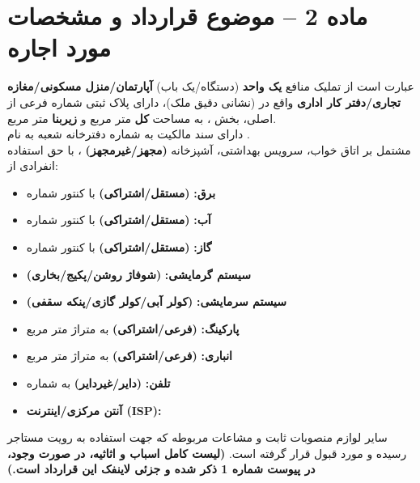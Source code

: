 \documentclass[14pt]{article}
\begin{document}
	\section*{ماده 2 – موضوع قرارداد و مشخصات مورد اجاره}
	عبارت است از تملیک منافع
	\textbf{یک واحد} (دستگاه/یک باب)
	\textbf{آپارتمان/منزل مسکونی/مغازه تجاری/دفتر کار اداری}
	 واقع در
	\underline{\hspace{5cm}}
	 (نشانی دقیق ملک)، دارای پلاک ثبتی شماره
	\underline{\hspace{2cm}}
	 فرعی از
	\underline{\hspace{2cm}}
	 اصلی، بخش
	\underline{\hspace{2cm}}
	، به مساحت
	\textbf{کل}
	\underline{\hspace{2cm}}
	 متر مربع و
	\textbf{زیربنا}
	\underline{\hspace{2cm}}
	 متر مربع.
	\\
	دارای سند مالکیت به شماره
	\underline{\hspace{3cm}}
	 دفترخانه
	\underline{\hspace{2cm}}
	 شعبه
	\underline{\hspace{1cm}}
	 به نام
	\underline{\hspace{2cm}}
	.
	\\
	مشتمل بر
	\underline{\hspace{1cm}}
	 اتاق خواب،
	\underline{\hspace{1cm}}
	 سرویس بهداشتی، آشپزخانه
	\textbf{(مجهز/غیرمجهز)}
	، با حق استفاده انفرادی از:
	\begin{itemize}
		\item
		\textbf{برق:}
		\textbf{(مستقل/اشتراکی)} با کنتور شماره
		\underline{\hspace{3cm}}
		\item
		\textbf{آب:}
		\textbf{(مستقل/اشتراکی)} با کنتور شماره
		\underline{\hspace{3cm}}
		\item
		\textbf{گاز:}
		\textbf{(مستقل/اشتراکی)} با کنتور شماره
		\underline{\hspace{3cm}}
		\item
		\textbf{سیستم گرمایشی:}
		\textbf{(شوفاژ روشن/پکیج/بخاری)}
		\item
		\textbf{سیستم سرمایشی:}
		\textbf{(کولر آبی/کولر گازی/پنکه سقفی)}
		\item
		\textbf{پارکینگ:}
		\textbf{(فرعی/اشتراکی)} به متراژ
		\underline{\hspace{2cm}} متر مربع
		\item
		\textbf{انباری:}
		\textbf{(فرعی/اشتراکی)} به متراژ
		\underline{\hspace{2cm}} متر مربع
		\item
		\textbf{تلفن:}
		\textbf{(دایر/غیردایر)} به شماره
		\underline{\hspace{3cm}}
		\item
		\textbf{آنتن مرکزی/اینترنت (ISP):}
		\underline{\hspace{4cm}}
	\end{itemize}
	سایر لوازم منصوبات ثابت و مشاعات مربوطه که جهت استفاده به رویت مستاجر رسیده و مورد قبول قرار گرفته است.
	\textbf{(لیست کامل اسباب و اثاثیه، در صورت وجود، در پیوست شماره 1 ذکر شده و جزئی لاینفک این قرارداد است.)}
	
\end{document}
